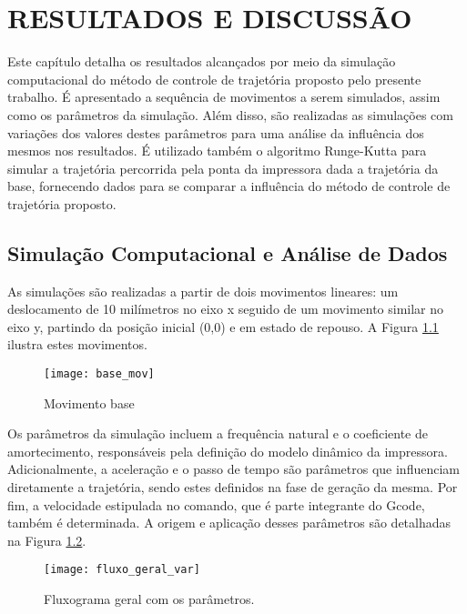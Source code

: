\chapter{RESULTADOS E DISCUSSÃO}
Este capítulo detalha os resultados alcançados por meio da simulação computacional do método de controle de trajetória proposto pelo presente trabalho. É apresentado a sequência de movimentos a serem simulados, assim como os parâmetros da simulação. Além disso, são realizadas as simulações com variações dos valores destes parâmetros para uma análise da influência dos mesmos nos resultados. É utilizado também o algoritmo Runge-Kutta para simular a trajetória percorrida pela ponta da impressora dada a trajetória da base, fornecendo dados para se comparar a influência do método de controle de trajetória proposto.

\section{Simulação Computacional e Análise de Dados}

As simulações são realizadas a partir de dois movimentos lineares: um deslocamento de 10 milímetros no eixo x seguido de um movimento similar no eixo y, partindo da posição inicial (0,0) e em estado de repouso. A Figura \ref{fig:base_mov} ilustra estes movimentos.

\begin{figure}[H]
    \centering
    \caption{Movimento base}
    \texttt{[image: base\_mov]}

    \label{fig:base_mov}
\end{figure}

Os parâmetros da simulação incluem a frequência natural e o coeficiente de amortecimento, responsáveis pela definição do modelo dinâmico da impressora. Adicionalmente, a aceleração e o passo de tempo são parâmetros que influenciam diretamente a trajetória, sendo estes definidos na fase de geração da mesma. Por fim, a velocidade estipulada no comando, que é parte integrante do Gcode, também é determinada. A origem e aplicação desses parâmetros são detalhadas na Figura \ref{fig:fluxo_geral_var}.

\begin{figure}[H]
    \centering
    \caption{Fluxograma geral com os parâmetros.}
    \texttt{[image: fluxo\_geral\_var]}

    \label{fig:fluxo_geral_var}
\end{figure}

